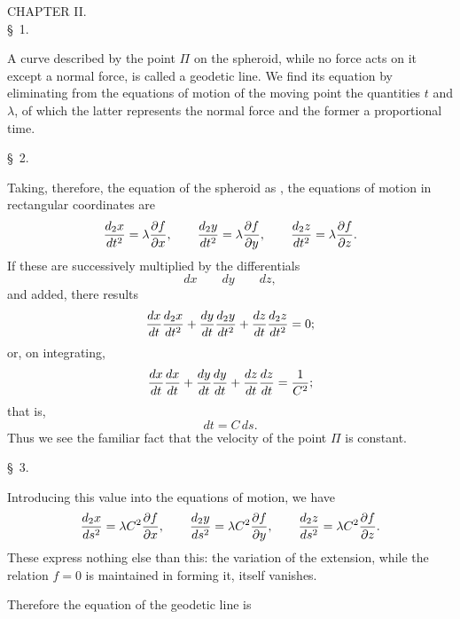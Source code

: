 \begin{center}
{\large CHAPTER II.}\\[0.8em]
\S\ 1.
\end{center}
A curve described by the point $\Pi$ on the spheroid, while no force acts on it except a normal force, is called a geodetic line. We find its equation by eliminating from the equations of motion of the moving point the quantities $t$ and $\lambda$, of which the latter represents the normal force and the former a proportional time.

\begin{center}\S\ 2.\end{center}
Taking, therefore, the equation of the spheroid as , the equations of motion in rectangular coordinates are
\[
 {d_2x\over dt^2}=\lambda{\partial f\over\partial x},\qquad
 {d_2y\over dt^2}=\lambda{\partial f\over\partial y},\qquad
 {d_2z\over dt^2}=\lambda{\partial f\over\partial z}.
\]
If these are successively multiplied by the differentials
\[
 dx\qquad dy\qquad dz,
\]
and added, there results
\[
 {dx\over dt}{d_2x\over dt^2}+{dy\over dt}{d_2y\over dt^2}+{dz\over dt}{d_2z\over dt^2}=0;
\]
or, on integrating,
\[
 {dx\over dt}{dx\over dt}+{dy\over dt}{dy\over dt}+{dz\over dt}{dz\over dt}={1\over C^2};
\]
that is,
\[
 dt=C\,ds.
\]
Thus we see the familiar fact that the velocity of the point $\Pi$ is constant.

\begin{center}\S\ 3.\end{center}
Introducing this value into the equations of motion, we have
\[
 {d_2x\over ds^2}=\lambda C^2{\partial f\over\partial x},\qquad
 {d_2y\over ds^2}=\lambda C^2{\partial f\over\partial y},\qquad
 {d_2z\over ds^2}=\lambda C^2{\partial f\over\partial z}.
\]
These express nothing else than this: the variation of the extension, while the relation $f=0$ is maintained in forming it, itself vanishes.

Therefore the equation of the geodetic line is
